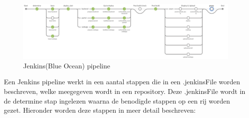 \begin{figure}
    \myfloatalign
    \includegraphics[width=15cm]{gfx/Screenshot 2021-08-18 Jenkins PipeLine}
    \caption{Jenkins(Blue Ocean) pipeline}
    \label{fig:JenkinsPipeLine}
\end{figure}
Een Jenkins pipeline werkt in een aantal stappen die in een .jenkinsFile worden beschreven, welke meegegeven wordt in een repository. Deze .jenkinsFile wordt in de determine stap ingelezen waarna de benodigde stappen op een rij worden gezet. Hieronder worden deze stappen in meer detail beschreven:

